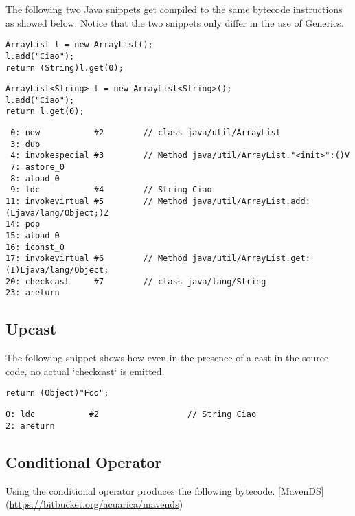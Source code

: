 The following two Java snippets get compiled to the same bytecode instructions as showed below. 
Notice that the two snippets only differ in the use of Generics. 

\lstset{language=java,label= ,caption= ,captionpos=b,numbers=none}
\begin{lstlisting}
ArrayList l = new ArrayList(); 
l.add("Ciao"); 
return (String)l.get(0); 
\end{lstlisting}

\lstset{language=java,label= ,caption= ,captionpos=b,numbers=none}
\begin{lstlisting}
ArrayList<String> l = new ArrayList<String>(); 
l.add("Ciao"); 
return l.get(0); 
\end{lstlisting}

\begin{verbatim}
 0: new           #2        // class java/util/ArrayList 
 3: dup 
 4: invokespecial #3        // Method java/util/ArrayList."<init>":()V 
 7: astore_0 
 8: aload_0 
 9: ldc           #4        // String Ciao 
11: invokevirtual #5        // Method java/util/ArrayList.add:(Ljava/lang/Object;)Z 
14: pop 
15: aload_0 
16: iconst_0 
17: invokevirtual #6        // Method java/util/ArrayList.get:(I)Ljava/lang/Object; 
20: checkcast     #7        // class java/lang/String 
23: areturn 
\end{verbatim}

\subsection{Upcast}
\label{sec:orgdc8750a}

The following snippet shows how even in the presence of a cast in the source code, 
no actual `checkcast` is emitted. 

\lstset{language=java,label= ,caption= ,captionpos=b,numbers=none}
\begin{lstlisting}
return (Object)"Foo"; 
\end{lstlisting}

\begin{verbatim}
0: ldc           #2                  // String Ciao 
2: areturn 
\end{verbatim}

\subsection{Conditional Operator}
\label{sec:orgbeee934}

Using the conditional operator produces the following bytecode. 
[MavenDS](\url{https://bitbucket.org/acuarica/mavends}) 

